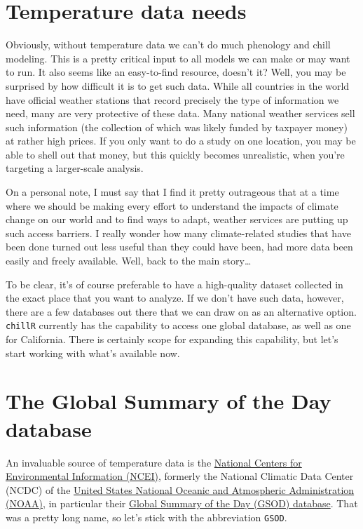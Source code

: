 \documentclass[
]{book}
\begin{document}
\hypertarget{temperature-data-needs}{%
\section{Temperature data needs}\label{temperature-data-needs}}

Obviously, without temperature data we can't do much phenology and chill modeling. This is a pretty critical input to all models we can make or may want to run. It also seems like an easy-to-find resource, doesn't it? Well, you may be surprised by how difficult it is to get such data. While all countries in the world have official weather stations that record precisely the type of information we need, many are very protective of these data. Many national weather services sell such information (the collection of which was likely funded by taxpayer money) at rather high prices. If you only want to do a study on one location, you may be able to shell out that money, but this quickly becomes unrealistic, when you're targeting a larger-scale analysis.

On a personal note, I must say that I find it pretty outrageous that at a time where we should be making every effort to understand the impacts of climate change on our world and to find ways to adapt, weather services are putting up such access barriers. I really wonder how many climate-related studies that have been done turned out less useful than they could have been, had more data been easily and freely available. Well, back to the main story\ldots{}

To be clear, it's of course preferable to have a high-quality dataset collected in the exact place that you want to analyze. If we don't have such data, however, there are a few databases out there that we can draw on as an alternative option. \texttt{chillR} currently has the capability to access one global database, as well as one for California. There is certainly scope for expanding this capability, but let's start working with what's available now.

\hypertarget{the-global-summary-of-the-day-database}{%
\section{The Global Summary of the Day database}\label{the-global-summary-of-the-day-database}}

An invaluable source of temperature data is the \href{https://www.ncei.noaa.gov/}{National Centers for Environmental Information (NCEI)}, formerly the National Climatic Data Center (NCDC) of the \href{https://www.noaa.gov/}{United States National Oceanic and Atmospheric Administration (NOAA)}, in particular their \href{https://www.ncei.noaa.gov/access/search/data-search/global-summary-of-the-day}{Global Summary of the Day (GSOD) database}. That was a pretty long name, so let's stick with the abbreviation \texttt{GSOD}.
\end{document}
